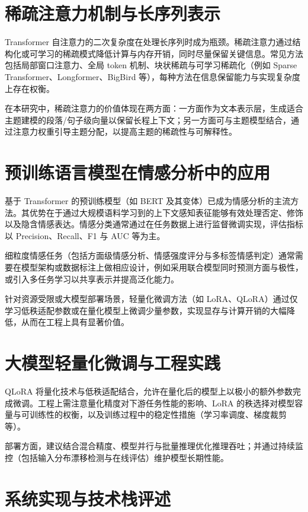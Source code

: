 \section{稀疏注意力机制与长序列表示}
\label{sec:sparse_attention}

Transformer 自注意力的二次复杂度在处理长序列时成为瓶颈。稀疏注意力通过结构化或可学习的稀疏模式降低计算与内存开销，同时尽量保留关键信息。常见方法包括局部窗口注意力、全局 token 机制、块状稀疏与可学习稀疏化（例如 Sparse Transformer、Longformer、BigBird 等），每种方法在信息保留能力与实现复杂度上存在权衡。

在本研究中，稀疏注意力的价值体现在两方面：一方面作为文本表示层，生成适合主题建模的段落/句子级向量以保留长程上下文；另一方面可与主题模型结合，通过注意力权重引导主题分配，以提高主题的稀疏性与可解释性。

\section{预训练语言模型在情感分析中的应用}
\label{sec:pretrained_models}

基于 Transformer 的预训练模型（如 BERT 及其变体）已成为情感分析的主流方法。其优势在于通过大规模语料学习到的上下文感知表征能够有效处理否定、修饰以及隐含情感表达。情感分类通常通过在任务数据上进行监督微调实现，评估指标以 Precision、Recall、F1 与 AUC 等为主。

细粒度情感任务（包括方面级情感分析、情感强度评分与多标签情感判定）通常需要在模型架构或数据标注上做相应设计，例如采用联合模型同时预测方面与极性，或引入多任务学习以共享表示并提高泛化能力。

针对资源受限或大模型部署场景，轻量化微调方法（如 LoRA、QLoRA）通过仅学习低秩适配参数或在量化模型上微调少量参数，实现显存与计算开销的大幅降低，从而在工程上具有显著价值。

\section{大模型轻量化微调与工程实践}
\label{sec:qlora}

QLoRA 将量化技术与低秩适配结合，允许在量化后的模型上以极小的额外参数完成微调。工程上需注意量化精度对下游任务性能的影响、LoRA 的秩选择对模型容量与可训练性的权衡，以及训练过程中的稳定性措施（学习率调度、梯度裁剪等）。

部署方面，建议结合混合精度、模型并行与批量推理优化推理吞吐；并通过持续监控（包括输入分布漂移检测与在线评估）维护模型长期性能。

\section{系统实现与技术栈评述}
\label{sec:tech_stack}

